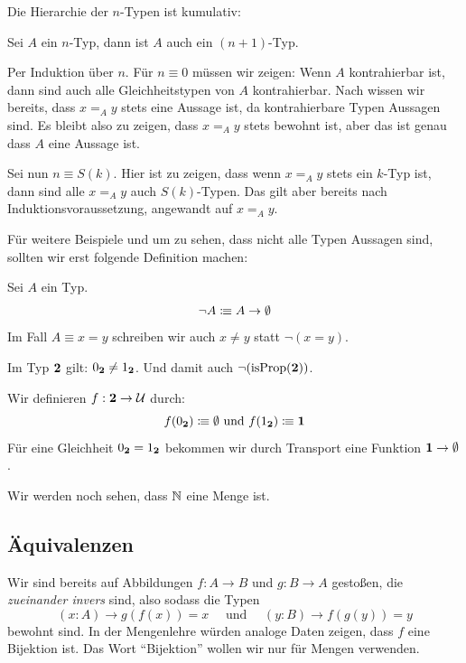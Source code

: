 Die Hierarchie der $n$-Typen ist kumulativ:

\begin{lemma}
  Sei $A$ ein $n$-Typ, dann ist $A$ auch ein $(n+1)$-Typ.
\end{lemma}

\begin{beweis}
  Per Induktion über $n$.
  Für $n\equiv 0$ müssen wir zeigen: Wenn $A$ kontrahierbar ist, dann sind auch alle Gleichheitstypen von $A$ kontrahierbar.
  Nach  wissen wir bereits, dass $x=_Ay$ stets eine Aussage ist,
  da kontrahierbare Typen Aussagen sind.
  Es bleibt also zu zeigen, dass $x=_Ay$ stets bewohnt ist, aber das ist genau dass $A$ eine Aussage ist.

  Sei nun $n\equiv S(k)$. Hier ist zu zeigen, dass wenn $x=_Ay$ stets ein $k$-Typ ist,
  dann sind alle $x=_Ay$ auch $S(k)$-Typen. Das gilt aber bereits nach Induktionsvoraussetzung, angewandt auf $x=_Ay$.
\end{beweis}

Für weitere Beispiele und um zu sehen, dass nicht alle Typen Aussagen sind, sollten wir erst folgende Definition machen:

\begin{definition}
  Sei $A$ ein Typ.
  \[
    \neg A\vcentcolon\mspace{-1.2mu}\equiv A\to\emptyset
    \]
    Im Fall $A\equiv x=y$ schreiben wir auch $x\neq y$ statt $\neg(x=y)$.
\end{definition}

\begin{bemerkung}
  Im Typ $\mathbf{2}$ gilt: $0_{\mathbf{2}}\neq 1_{\mathbf{2}}$. Und damit auch $\neg(\mathrm{isProp}(\mathbf{2}))$.
\end{bemerkung}
\begin{beweis}
  Wir definieren $f:\mathbf{2}\to\mathcal{U}$ durch:
  \[
    f(0_{\mathbf{2}})\vcentcolon\mspace{-1.2mu}\equiv \emptyset\text{ und }f(1_{\mathbf{2}})\vcentcolon\mspace{-1.2mu}\equiv \mathbf{1}
    \]
    Für eine Gleichheit $0_{\mathbf{2}}=1_{\mathbf{2}}$ bekommen wir durch Transport eine Funktion $\mathbf{1}\to\emptyset$.
\end{beweis}

Wir werden noch sehen, dass $\mathbb{N}$ eine Menge ist.

\subsection{Äquivalenzen}

Wir sind bereits auf Abbildungen $f:A\to B$ und $g:B\to A$ gestoßen, die \emph{zueinander invers} sind, also sodass die Typen
\[
  (x:A)\to g(f(x))=x\quad \text{ und }\quad (y:B)\to f(g(y))=y 
\]
bewohnt sind.
In der Mengenlehre würden analoge Daten zeigen, dass $f$ eine Bijektion ist.
Das Wort ``Bijektion'' wollen wir nur für Mengen verwenden.

